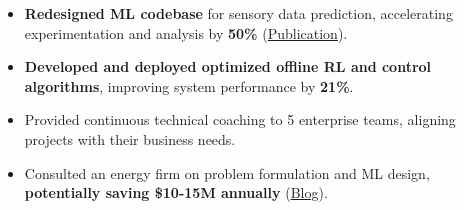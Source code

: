 {
}
\begin{itemize}
    \item \textbf{Redesigned ML codebase} for sensory data prediction, accelerating experimentation and analysis by \textbf{50\%} (\href{https://link.springer.com/article/10.1007/s10994-023-06413-x}{Publication}).
    \item \textbf{Developed and deployed optimized offline RL and control algorithms}, improving system performance by \textbf{21\%}.
\end{itemize}

{
}

    
\begin{itemize}
    \item Provided continuous technical coaching to 5 enterprise teams, aligning projects with their business needs.
    \item Consulted an energy firm on problem formulation and ML design, \textbf{potentially saving \$10-15M annually} (\href{https://www.amii.ca/latest-from-amii/venturi-uses-machine-learning-reduce-emissions-increase-safety-pipelines/}{Blog}).
\end{itemize}


